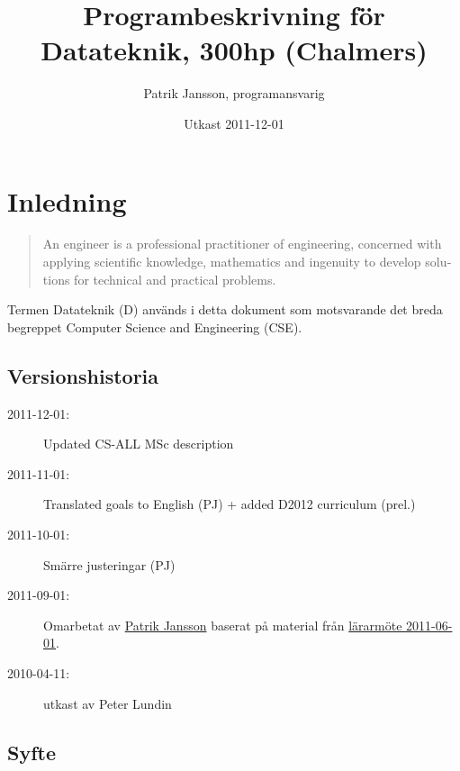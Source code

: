 \documentclass[twocolumn]{article}
\title{Programbeskrivning för Datateknik, 300hp (Chalmers)}
\author{Patrik Jansson, programansvarig}
\date{Utkast 2011-12-01}
\begin{document}
\maketitle
\section{Inledning}

\begin{quote}
  \foreignlanguage{british}{An engineer is a professional practitioner
    of engineering, concerned with applying scientific knowledge,
    mathematics and ingenuity to develop solutions for technical and
    practical problems. }
\end{quote}

Termen Datateknik (D) används i detta dokument som motsvarande det
breda begreppet \foreignlanguage{british}{Computer Science and
  Engineering (CSE)}.

\subsection*{Versionshistoria}
{\small
\begin{description}
\item[2011-12-01:] Updated CS-ALL MSc description
\item[2011-11-01:] Translated goals to English (PJ) + added D2012 curriculum (prel.)
\item[2011-10-01:] Smärre justeringar (PJ)
\item[2011-09-01:] Omarbetat av \href{http://www.chalmers.se/cse/EN/people/jansson-patrik}{Patrik Jansson} baserat på material från 
\href{http://wiki.portal.chalmers.se/cse/pmwiki.php/PAD/L%C3%A4rarm%C3%B6teVT2011}{lärarmöte 2011-06-01}.
\item[2010-04-11:] utkast av Peter Lundin
\end{description}
}

\subsection{Syfte} 
\end{document}
